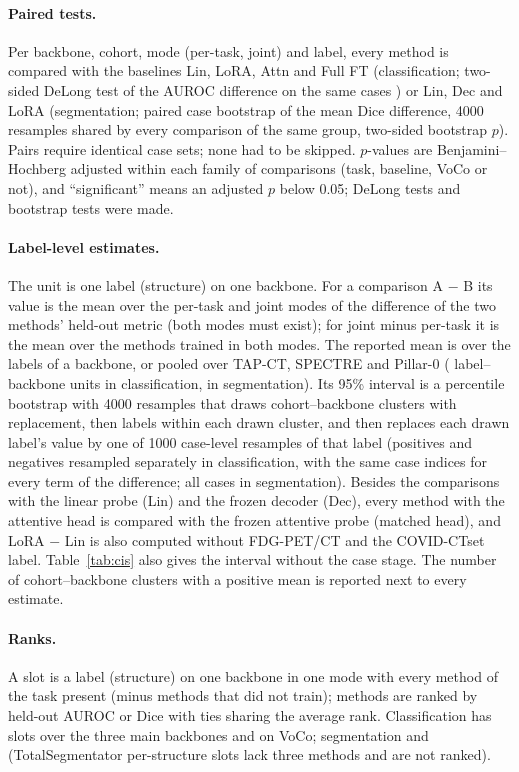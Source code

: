 \paragraph{Paired tests.} Per backbone, cohort, mode (per-task, joint) and label, every method is compared with the baselines Lin, LoRA, Attn and Full FT (classification; two-sided DeLong test of the AUROC difference on the same cases \citep{delong1988}) or Lin, Dec and LoRA (segmentation; paired case bootstrap of the mean Dice difference, 4000 resamples shared by every comparison of the same group, two-sided bootstrap $p$). Pairs require identical case sets; none had to be skipped. $p$-values are Benjamini--Hochberg adjusted \citep{benjamini1995fdr} within each family of comparisons (task, baseline, VoCo or not), and ``significant'' means an adjusted $p$ below 0.05; \numDelongTestsN{} DeLong tests and \numSegpairedTestsN{} bootstrap tests were made.

\paragraph{Label-level estimates.} The unit is one label (structure) on one backbone. For a comparison A $-$ B its value is the mean over the per-task and joint modes of the difference of the two methods' held-out metric (both modes must exist); for joint minus per-task it is the mean over the methods trained in both modes. The reported mean is over the labels of a backbone, or pooled over TAP-CT, SPECTRE and Pillar-0 (\numCiClsloralinAllLabelsN{} label--backbone units in classification, \numCiSegdeclinAllLabelsN{} in segmentation). Its 95\% interval is a percentile bootstrap with 4000 resamples that draws cohort--backbone clusters with replacement, then labels within each drawn cluster, and then replaces each drawn label's value by one of 1000 case-level resamples of that label (positives and negatives resampled separately in classification, with the same case indices for every term of the difference; all cases in segmentation). Besides the comparisons with the linear probe (Lin) and the frozen decoder (Dec), every method with the attentive head is compared with the frozen attentive probe (matched head), and LoRA $-$ Lin is also computed without FDG-PET/CT and the COVID-CTset label. Table~\ref{tab:cis} also gives the interval without the case stage. The number of cohort--backbone clusters with a positive mean is reported next to every estimate.

\paragraph{Ranks.} A slot is a label (structure) on one backbone in one mode with every method of the task present (minus methods that did not train); methods are ranked by held-out AUROC or Dice with ties sharing the average rank. Classification has \numRankSlotsN{} slots over the three main backbones and \numVocorankSlotsN{} on VoCo; segmentation \numSegrankSlotsN{} and \numVocosegrankSlotsN{} (TotalSegmentator per-structure slots lack three methods and are not ranked).

